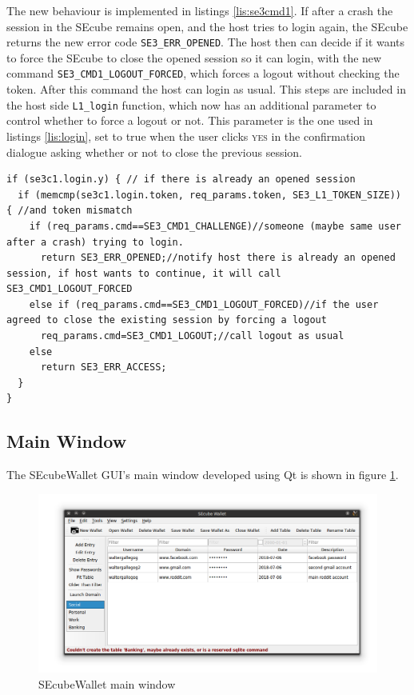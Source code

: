 The new behaviour is implemented in listings \ref{lis:se3cmd1}.
If after a crash the session in the SEcube remains open, and the host tries to login again, the SEcube returns the new error code \texttt{SE3\_ERR\_OPENED}. The host then can decide if it wants to force the SEcube to close the opened session so it can login, with the new command \texttt{SE3\_CMD1\_LOGOUT\_FORCED}, which forces a logout without checking the token. After this command the host can login as usual. This steps are included in the host side \texttt{L1\_login} function, which now has an additional parameter to control whether to force a logout or not. This parameter is the one used in listings \ref{lis:login}, set to true when the user clicks \textsc{yes} in the confirmation dialogue asking whether or not to close the previous session.

\begin{lstlisting}[style=customc, float=htb, caption={Modification in SEcubeFirmware, file se3\_cmd1.c}, label = {lis:se3cmd1}]
if (se3c1.login.y) { // if there is already an opened session
  if (memcmp(se3c1.login.token, req_params.token, SE3_L1_TOKEN_SIZE)) { //and token mismatch
    if (req_params.cmd==SE3_CMD1_CHALLENGE)//someone (maybe same user after a crash) trying to login.
      return SE3_ERR_OPENED;//notify host there is already an opened session, if host wants to continue, it will call SE3_CMD1_LOGOUT_FORCED
    else if (req_params.cmd==SE3_CMD1_LOGOUT_FORCED)//if the user agreed to close the existing session by forcing a logout
      req_params.cmd=SE3_CMD1_LOGOUT;//call logout as usual  
    else
      return SE3_ERR_ACCESS;
  }
}
\end{lstlisting}




\subsection{Main Window}

The SEcubeWallet GUI's main window developed using Qt is shown in figure \ref{fig:mainWindow}.

\begin{figure}[htb]
  \centering
  \captionsetup{justification=centering}
  \centerline{\includegraphics[width=1.2\columnwidth]{chapters/figures/development/mainWindow.png}}
  \caption{SEcubeWallet main window}
  \label{fig:mainWindow}
\end{figure}

